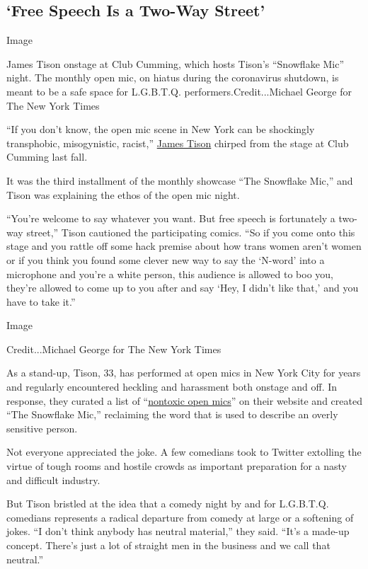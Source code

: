 \hypertarget{free-speech-is-a-two-way-street}{%
\subsection{`Free Speech Is a Two-Way
Street'}\label{free-speech-is-a-two-way-street}}

Image

James Tison onstage at Club Cumming, which hosts Tison's ``Snowflake
Mic'' night. The monthly open mic, on hiatus during the coronavirus
shutdown, is meant to be a safe space for L.G.B.T.Q.
performers.Credit...Michael George for The New York Times

``If you don't know, the open mic scene in New York can be shockingly
transphobic, misogynistic, racist,''
\href{https://www.jamestison.com/}{James Tison} chirped from the stage
at Club Cumming last fall.

It was the third installment of the monthly showcase ``The Snowflake
Mic,'' and Tison was explaining the ethos of the open mic night.

``You're welcome to say whatever you want. But free speech is
fortunately a two-way street,'' Tison cautioned the participating
comics. ``So if you come onto this stage and you rattle off some hack
premise about how trans women aren't women or if you think you found
some clever new way to say the `N-word' into a microphone and you're a
white person, this audience is allowed to boo you, they're allowed to
come up to you after and say `Hey, I didn't like that,' and you have to
take it.''

Image

Credit...Michael George for The New York Times

As a stand-up, Tison, 33, has performed at open mics in New York City
for years and regularly encountered heckling and harassment both onstage
and off. In response, they curated a list of
``\href{https://www.jamestison.com/faq}{nontoxic open mics}'' on their
website and created ``The Snowflake Mic,'' reclaiming the word that is
used to describe an overly sensitive person.

Not everyone appreciated the joke. A few comedians took to Twitter
extolling the virtue of tough rooms and hostile crowds as important
preparation for a nasty and difficult industry.

But Tison bristled at the idea that a comedy night by and for L.G.B.T.Q.
comedians represents a radical departure from comedy at large or a
softening of jokes. ``I don't think anybody has neutral material,'' they
said. ``It's a made-up concept. There's just a lot of straight men in
the business and we call that neutral.''

